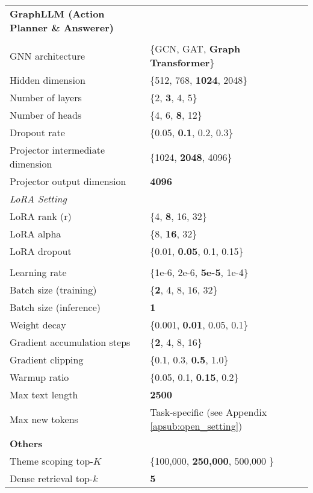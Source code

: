 \begin{table*}[!h]
\begin{tabular}{ll}
\midrule
\textbf{GraphLLM (Action Planner \& Answerer)} \\
\hdashline
\multicolumn{2}{l}{\textit{GNN Setting (for Graph Token)}} \\
GNN architecture & \{GCN, GAT, \textbf{Graph Transformer}\} \\
Hidden dimension & \{512, 768, \textbf{1024}, 2048\} \\
Number of layers & \{2, \textbf{3}, 4, 5\} \\
Number of heads & \{4, 6, \textbf{8}, 12\} \\
Dropout rate & \{0.05, \textbf{0.1}, 0.2, 0.3\} \\
Projector intermediate dimension & \{1024, \textbf{2048}, 4096\} \\
Projector output dimension & \textbf{4096} \\
\hdashline
\textit{LoRA Setting} \\
LoRA rank (r) & \{4, \textbf{8}, 16, 32\} \\
LoRA alpha & \{8, \textbf{16}, 32\} \\
LoRA dropout & \{0.01, \textbf{0.05}, 0.1, 0.15\} \\
\hdashline
\multicolumn{2}{l}{\textit{General Setting}} \\
Learning rate & \{1e-6, 2e-6, \textbf{5e-5}, 1e-4\} \\
Batch size (training) & \{\textbf{2}, 4, 8, 16, 32\} \\
Batch size (inference) & \textbf{1} \\
Weight decay & \{0.001, \textbf{0.01}, 0.05, 0.1\} \\
Gradient accumulation steps & \{\textbf{2}, 4, 8, 16\} \\
Gradient clipping & \{0.1, 0.3, \textbf{0.5}, 1.0\} \\
Warmup ratio & \{0.05, 0.1, \textbf{0.15}, 0.2\} \\
Max text length & \textbf{2500} \\
Max new tokens & Task-specific (see Appendix \ref{apsub:open_setting}) \\
\midrule
\textbf{Others} \\
Theme scoping top-$K$ & \{100,000, \textbf{250,000}, 500,000 \}\\
Dense retrieval top-$k$ & \textbf{5} \\


\bottomrule



\end{tabular}

\label{tb:hyperparams}
\end{table*}